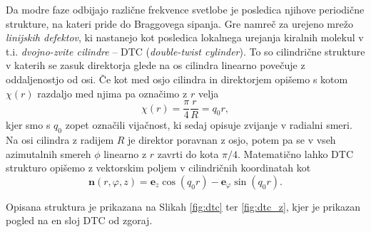\documentclass[longbibliography,slovene,a4paper,12pt]{book}
\begin{document}
Da modre faze odbijajo različne frekvence svetlobe je posledica njihove periodične strukture, na kateri pride do Braggovega sipanja. Gre namreč za urejeno mrežo \emph{linijskih defektov}, ki nastanejo kot posledica lokalnega urejanja kiralnih molekul v t.i. \emph{dvojno-zvite cilindre} -- DTC (\emph{double-twist cylinder}). To so cilindrične strukture v katerih se zasuk direktorja glede na os cilindra linearno povečuje z oddaljenostjo od osi. Če kot med osjo cilindra in direktorjem opišemo s kotom $\chi(r)$ razdaljo med njima pa označimo z $r$ velja
\begin{equation}
\chi(r) = \frac{\pi}{4} \frac{r}{R} = q_0 r,
\end{equation}
kjer smo s $q_0$ zopet označili vijačnost, ki sedaj opisuje zvijanje v radialni smeri.
Na osi cilindra z radijem $R$ je direktor poravnan z osjo, potem pa se v vseh azimutalnih smereh $\phi$ linearno z $r$ zavrti do kota $\pi/4$. Matematično lahko DTC strukturo opišemo z vektorskim poljem v cilindričnih koordinatah kot
\begin{equation}
\mathbf{n}(r, \varphi, z) = \mathbf{e}_z \cos (q_0r)  -   \mathbf{e}_\varphi \sin (q_0r).
\label{dtcdirector}
\end{equation}

Opisana struktura je prikazana na Slikah \ref{fig:dtc} ter \ref{fig:dtc_z}, kjer je prikazan pogled na en sloj DTC od zgoraj.\\
\end{document}
